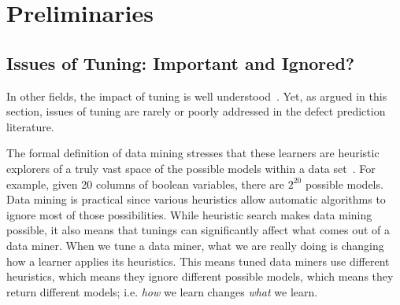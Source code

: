 \documentclass[smallextended]{svjour3}
\begin{document}


\section{Preliminaries}
\subsection{Issues of Tuning: Important and Ignored?}
In  other fields, the impact of tuning is well understood~\cite{Bergstra2012}. 
Yet, as argued in this section, issues of tuning  are rarely or poorly addressed
in the defect prediction literature.

The formal definition of data mining stresses that these learners are heuristic explorers
of a truly   vast space of the possible models within a data set~\cite{mitchell1982generalization}. For example, given 20 columns of boolean variables,
there are $2^{20}$ possible models. Data mining is practical since various heuristics
allow automatic algorithms to ignore most of those possibilities. While heuristic search makes data mining possible, it also means that tunings
can significantly affect what comes out of a data miner.
When we tune a data miner, what we are really doing is changing how a learner applies
its heuristics. This means tuned data miners use different heuristics, which means they ignore different possible models, which means they return different models; i.e.  {\em how} we learn changes {\em what} we learn.
\end{document}
